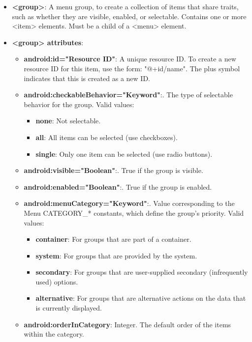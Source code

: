 \documentclass{report}
\begin{document}
\begin{itemize}
\begin{itemize}
            \end{itemize}
        \item \textbf{<group>}: A menu group, to create a collection of items that share traits, such as whether they are visible, enabled, or selectable. Contains one or more <item> elements. Must be a child of a <menu> element.
        \item \textbf{<group> attributes}:
            \begin{itemize}
                \item \textbf{android:id="Resource ID"}: A unique resource ID. To create a new resource ID for this item, use the form: "@+id/name". The plus symbol indicates that this is created as a new ID.
                \item \textbf{android:checkableBehavior="Keyword"}:. The type of selectable behavior for the group. Valid values:
                    \begin{itemize}
                        \item \textbf{none}:	Not selectable.
                        \item \textbf{all}:	All items can be selected (use checkboxes).
                        \item \textbf{single}:	Only one item can be selected (use radio buttons).
                    \end{itemize}
                \item \textbf{android:visible="Boolean"}:. True if the group is visible.
                \item \textbf{android:enabled="Boolean"}:. True if the group is enabled.
                \item \textbf{android:menuCategory="Keyword"}:. Value corresponding to the Menu CATEGORY\_* constants, which define the group's priority. Valid values:
                    \begin{itemize}
                        \item \textbf{container}:	For groups that are part of a container.
                        \item \textbf{system}:	For groups that are provided by the system.
                        \item \textbf{secondary}:	For groups that are user-supplied secondary (infrequently used) options.
                        \item \textbf{alternative}:	For groups that are alternative actions on the data that is currently displayed.
                    \end{itemize}
                \item \textbf{android:orderInCategory}: Integer. The default order of the items within the category.
            \end{itemize}
        
    \end{itemize}
\end{document}
